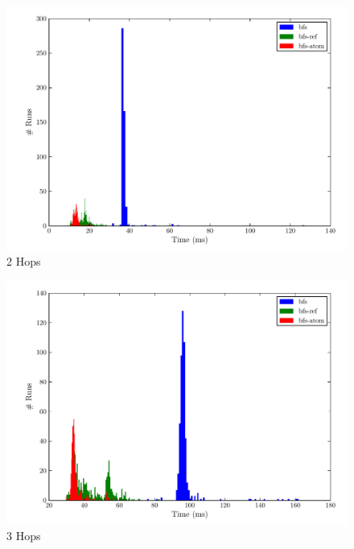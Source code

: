 \documentclass[12pt,letterpaper,oneside,notitlepage]{report}
\theoremstyle{definition}
\begin{document}
		\begin{figure}[!ht]
			\centering
			\includegraphics[scale=0.85]{2_hops}
			\caption{2 Hops}
			\label{fig:perf-2-hops}
		\end{figure}
		
		\begin{figure}[!ht]
			\centering
			\includegraphics[scale=0.85]{3_hops}
			\caption{3 Hops}
			\label{fig:perf-3-hops}
		\end{figure}
		
\end{document}
